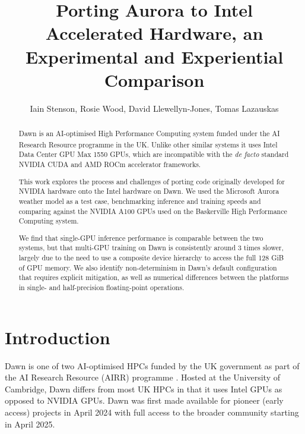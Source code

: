 \begin{titlepage}

\end{titlepage}
\title{Porting Aurora to Intel Accelerated Hardware, an Experimental and Experiential Comparison}
\author{Iain Stenson, Rosie Wood, David Llewellyn-Jones, Tomas Lazauskas}



\setcounter{page}{3}
\begin{abstract}
    Dawn is an AI-optimised High Performance Computing system funded under the AI Research Resource programme in the UK. Unlike other similar systems it uses Intel\textsuperscript{\tiny\textregistered} Data Center GPU Max 1550 GPUs, which are incompatible with the \textit{de facto} standard NVIDIA CUDA and AMD ROCm accelerator frameworks.

    This work explores the process and challenges of porting code originally developed for NVIDIA hardware onto the Intel hardware on Dawn. We used the Microsoft Aurora weather model as a test case, benchmarking inference and training speeds and comparing against the NVIDIA A100 GPUs used on the Baskerville High Performance Computing system.

    We find that single-GPU inference performance is comparable between the two systems, but that multi-GPU training on Dawn is consistently around 3 times slower, largely due to the need to use a composite device hierarchy to access the full 128 GiB of GPU memory. We also identify non-determinism in Dawn's default configuration that requires explicit mitigation, as well as numerical differences between the platforms in single- and half-precision floating-point operations.
\end{abstract}

\newpage
{\setlength{\parskip}{0pt}
\setcounter{tocdepth}{2}
\tableofcontents}
\newpage

\section{Introduction}

Dawn is one of two AI-optimised HPCs funded by the UK government as part of the AI Research Resource (AIRR) programme \cite{applencourt1014dawn,mcintosh2024isambard}. Hosted at the University of Cambridge, Dawn differs from most UK HPCs in that it uses Intel GPUs as opposed to NVIDIA GPUs. Dawn was first made available for pioneer (early access) projects in April 2024 with full access to the broader community starting in April 2025.


